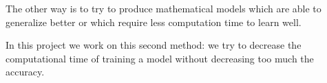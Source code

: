 \documentclass{article}
\begin{document}
    The other way is to try to produce mathematical models which are able to
    generalize better or which require less computation
     time to learn well.

    In this project we work on this second method: we try to decrease the
    computational time of training a model without decreasing too much the
    accuracy.


\end{document}
